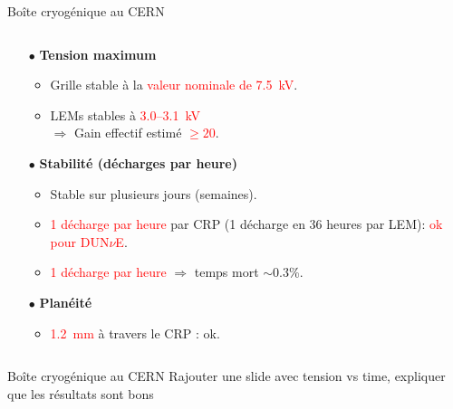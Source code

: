 \begin{frame}{Boîte cryogénique au CERN}
\begin{columns}
\begin{column}{0.6\textwidth}
\begin{scriptsize}
	    			\begin{itemize}
	    				\item[$\bullet$] \textbf{Tension maximum}
	    				\begin{itemize}
	    					\item Grille stable à la \textcolor{red}{valeur nominale de \SI{7.5}{\kilo\volt}}.
	    					\item LEMs stables à \textcolor{red}{3.0--\SI{3.1}{\kilo\volt}}\\
				    					$\Rightarrow$ Gain effectif estimé \textcolor{red}{$\geq 20$}.
	    				\end{itemize}
	    				\item[$\bullet$] \textbf{Stabilité (décharges par heure)}
	    				\begin{itemize}
	    					\item Stable sur plusieurs jours (semaines).
	    					\item \textcolor{red}{1 décharge par heure} par CRP (1 décharge en 36 heures par LEM): \textcolor{red}{ok pour DUN$\nu$E}.
	    					\item \textcolor{red}{1 décharge par heure} $\Rightarrow$ temps mort $\sim$0.3\%.
	    				\end{itemize}
	    				\item[$\bullet$] \textbf{Planéité}
	    				\begin{itemize}
	    					\item \textcolor{red}{\SI{1.2}{\milli\meter}} à travers le CRP : ok.
	    				\end{itemize}
	    			\end{itemize}
	    		\end{scriptsize}
    		\end{column}
    	\end{columns}
	    \end{frame}

    \begin{frame}{Boîte cryogénique au CERN}
        Rajouter une slide avec tension vs time, expliquer que les résultats sont bons
    \end{frame}

